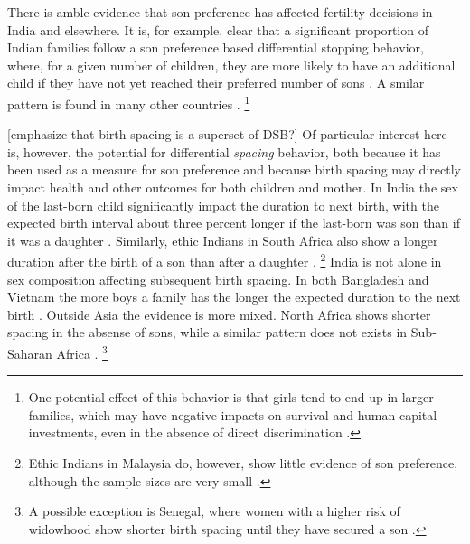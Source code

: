 There is amble evidence that son preference has affected fertility decisions in India and 
elsewhere.
It is, for example, clear that a significant proportion of Indian families follow a
son preference based differential stopping behavior, where, for a given number of
children, they are more likely to have an additional child if they have not yet
reached their preferred number of sons 
\citep{repetto72,Das1987,Arnold1997,arnold98,clark00,Basu2010,Barcellos2014}.
A smilar pattern is found in many other countries 
\citep[see, for example][]{larsen98,filmer09,Altindag2016}.%
\footnote{
One potential effect of this behavior is that girls tend to end up in larger families, 
which may have negative impacts on survival and human capital investments, even in 
the absence of direct discrimination \citet{Jensen2003,Kugler2017}.
}

[emphasize that birth spacing is a superset of DSB?]
Of particular interest here is, however, the potential for differential \emph{spacing} 
behavior, 
both because it has been used as a measure for son preference and because birth spacing 
may directly impact health and other outcomes for both children and mother.
In India the sex of the last-born child significantly impact the duration to next birth,
with the expected birth interval about three percent longer if the last-born was son than
if it was a daughter \citep{Bhalotra2008,Kumar2016}.
Similarly, ethic Indians in South Africa also show a longer duration after the birth of a 
son than after a daughter \citep{Gangadharan2003}.%
\footnote{
Ethic Indians in Malaysia do, however, show little evidence of son preference, although
the sample sizes are very small \citep{Pong1994}.
}
India is not alone in sex composition affecting subsequent birth spacing.
In both Bangladesh and Vietnam the more boys a family has the longer the expected duration 
to the next birth \citep{Haughton1995,Haughton1996,Rahman1993,Soest2018}.
Outside Asia the evidence is more mixed.
North Africa shows shorter spacing in the absense of sons, while a similar pattern does
not exists in Sub-Saharan Africa \citep{Rossi2015}.%
\footnote{
A possible exception is Senegal, where women with a higher risk of widowhood show
shorter birth spacing until they have secured a son \citep{Lambert2016}.
}

